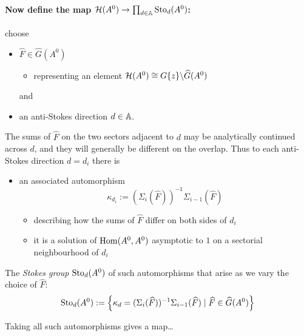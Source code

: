 \paragraph{Now define the map $\mathcal{H}(A^0)\to\prod_{d\in\mathbb{A}}\operatorname{Sto}_d(A^0)$:} choose
\begin{itemize}
  \item $\hat F\in\hat G(A^0)$
    \begin{itemize}
      \item representing an element
        $\mathcal{H}(A^0)\cong G\{z\}\backslash\widehat G(A^0)$
    \end{itemize}
    and
  \item an anti-Stokes direction $d\in\mathbb{A}$.
\end{itemize}
The sums of $\hat F$ on the two sectors adjacent to $d$ may be analytically
continued across $d$, and they will generally be different on the overlap. Thus
to each anti-Stokes direction $d=d_i$ there is
\begin{itemize}
  \item an associated automorphism
    \[
      \kappa_{d_i}:=(\Sigma_i(\hat F))^{-1}\Sigma_{i-1}(\hat F)
    \]
    \begin{itemize}
      \item describing how the sums of $\hat F$ differ on both sides of $d_i$
      \item it is a solution of $\operatorname{Hom}(A^0,A^0)$ asymptotic to $1$ on a
        sectorial neighbourhood of $d_i$
    \end{itemize}
\end{itemize}
\begin{defn}
  The \emph{Stokes group} $\operatorname{Sto}_d(A^0)$ of such automorphisms that arise as we
  vary the choice of $\hat F$:
  \[
    \operatorname{Sto}_d(A^0):=
      \left\{\kappa_d=(\Sigma_i(\widehat F))^{-1}\Sigma_{i-1}(\widehat F)
        \mid \widehat F\in\widehat G(A^0)\right\}
  \]
\end{defn}
Taking all such automorphisms gives a map\dots

